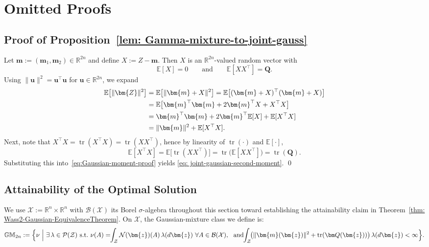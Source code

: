 \documentclass[opre,sglanonrev]{informs4}
\newcommand{\mZ}{\mathcal{Z}}
\newcommand{\mN}{\mathcal{N}}
\newcommand{\mX}{\mathcal{X}}
\newcommand{\mP}{\mathcal{P}}
\newcommand{\mB}{\mathcal{B}}
\newcommand{\mbR}{\mathbb R}
\newcommand{\mbE}{\mathbb{E}}
\newcommand{\mbGM}{\mathbb{GM}}
\newcommand{\bmean}{\bm{m}}
\newcommand{\bu}{\bm{u}}
\newcommand{\bz}{\bm{z}}
\newcommand{\bQ}{\bm Q}
\newcommand{\bZ}{\bm{Z}}
\newcommand{\Tr}{\operatorname{tr}}
\begin{document}
{\begin{APPENDICES}
\begin{itemize}[leftmargin=1em]
\end{itemize}

\section{Omitted Proofs}\label{appndx: ommited-proof}

\subsection{Proof of Proposition~\ref{lem: Gamma-mixture-to-joint-gauss}}\label{appndx:very-first-proof}

Let $\bmean:=(\bmean_1,\bmean_2)\in\mbR^{2n}$ and define $X:=Z-\bmean$. Then $X$ is an $\mbR^{2n}$-valued random vector with
\[
\mbE[X]=0
\qquad\text{and}\qquad
\mbE[XX^\top]=\bQ.
\]
Using $\|\bu\|^2=\bu^\top \bu$ for $\bu\in\mbR^{2n}$, we expand
\begin{align}
\mbE\bigl[\|\bZ\|^2\bigr]
&=\mbE\bigl[\|\bmean+X\|^2\bigr] 
=\mbE\bigl[(\bmean+X)^\top(\bmean+X)\bigr] \notag\\
&=\mbE\bigl[\bmean^\top\bmean + 2\bmean^\top X + X^\top X\bigr] \notag\\
&= \bmean^\top\bmean + 2\bmean^\top\mbE[X] + \mbE[X^\top X] \notag\\
&= \|\bmean\|^2 + \mbE[X^\top X]. \label{eq:Gaussian-moment-proof}
\end{align}
Next, note that $X^\top X=\Tr(X^\top X)=\Tr(X X^\top)$, hence by linearity of
$\Tr(\cdot)$ and $\mbE[\cdot]$,
\[
\mbE[X^\top X]
=\mbE\bigl[\Tr(X X^\top)\bigr]
=\Tr\bigl(\mbE[X X^\top]\bigr)
=\Tr(\bQ).
\]
Substituting this into~\eqref{eq:Gaussian-moment-proof} yields \eqref{eq: joint-gaussian-second-moment}.
\hfil \qed


\subsection{Attainability of the Optimal Solution}
We use $\mX:=\mbR^n\times \mbR^n$ with $\mB(\mX)$ its Borel $\sigma$-algebra throughout this section toward establishing the attainability claim in Theorem~\ref{thm: Wass2-Gaussian-EquivalenceTheorem}. On $\mX$, the Gaussian-mixture class we define is:
\begin{equation}\label{eq:def-GMMmix-2n}
\mbGM_{2n}
:=
\Bigl\{
\nu\ \Big|\ 
\exists\,\lambda\in\mP(\mZ)\ \mathrm{s.t.}\ 
\nu(A)= \hspace{-0.35em}\int_{\mZ}\mN(\bz)(A)\,\lambda(d\bz)\,\, \forall A\in\mB(\mX),
\ \ \text{and} \hspace{-0.25em}
\int_{\mZ}\!\bigl(\|\bmean(\bz)\|^2+\Tr(\bQ(\bz))\bigr)\,\lambda(d\bz)<\infty
\Bigr\}.
\end{equation}


\end{APPENDICES}}
\end{document}
